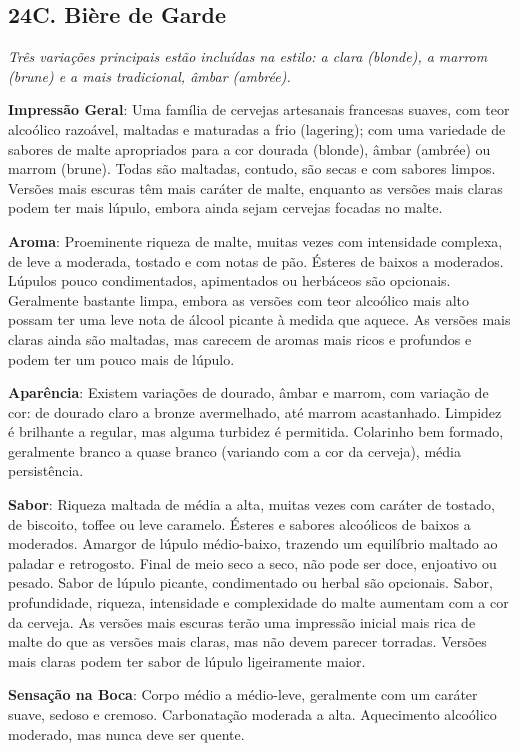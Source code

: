 \subsection*{24C. Bière de Garde}
\textit{Três variações principais estão incluídas na estilo: a clara (blonde), a marrom (brune) e a mais tradicional, âmbar (ambrée).}

\textbf{Impressão Geral}: Uma família de cervejas artesanais francesas suaves, com teor alcoólico razoável, maltadas e maturadas a frio (lagering); com uma variedade de sabores de malte apropriados para a cor dourada (blonde), âmbar (ambrée) ou marrom (brune). Todas são maltadas, contudo, são secas e com sabores limpos. Versões mais escuras têm mais caráter de malte, enquanto as versões mais claras podem ter mais lúpulo, embora ainda sejam cervejas focadas no malte.

\textbf{Aroma}: Proeminente riqueza de malte, muitas vezes com intensidade complexa, de leve a moderada, tostado e com notas de pão. Ésteres de baixos a moderados. Lúpulos pouco condimentados, apimentados ou herbáceos são opcionais. Geralmente bastante limpa, embora as versões com teor alcoólico mais alto possam ter uma leve nota de álcool picante à medida que aquece. As versões mais claras ainda são maltadas, mas carecem de aromas mais ricos e profundos e podem ter um pouco mais de lúpulo.

\textbf{Aparência}: Existem variações de dourado, âmbar e marrom, com variação de cor: de dourado claro a bronze avermelhado, até marrom acastanhado. Limpidez é brilhante a regular, mas alguma turbidez é permitida. Colarinho bem formado, geralmente branco a quase branco (variando com a cor da cerveja), média persistência.

\textbf{Sabor}: Riqueza maltada de média a alta, muitas vezes com caráter de tostado, de biscoito, toffee ou leve caramelo. Ésteres e sabores alcoólicos de baixos a moderados. Amargor de lúpulo médio-baixo, trazendo um equilíbrio maltado ao paladar e retrogosto. Final de meio seco a seco, não pode ser doce, enjoativo ou pesado. Sabor de lúpulo picante, condimentado ou herbal são opcionais. Sabor, profundidade, riqueza, intensidade e complexidade do malte aumentam com a cor da cerveja. As versões mais escuras terão uma impressão inicial mais rica de malte do que as versões mais claras, mas não devem parecer torradas. Versões mais claras podem ter sabor de lúpulo ligeiramente maior.

\textbf{Sensação na Boca}: Corpo médio a médio-leve, geralmente com um caráter suave, sedoso e cremoso. Carbonatação moderada a alta. Aquecimento alcoólico moderado, mas nunca deve ser quente.

